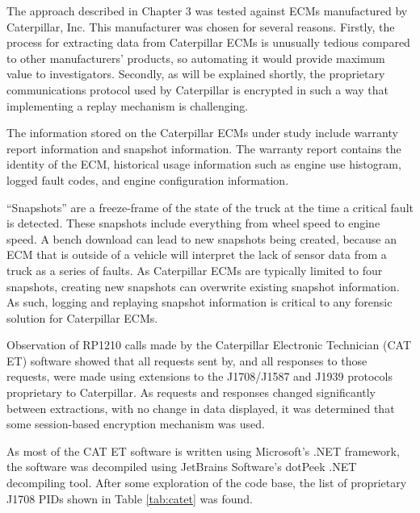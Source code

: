 
The approach described in Chapter 3 was tested against ECMs manufactured by Caterpillar, Inc. This manufacturer was
chosen for several reasons. Firstly, the process for extracting data from Caterpillar ECMs is unusually tedious compared
to other manufacturers' products, so automating it would provide maximum value to investigators.
Secondly, as will be explained shortly, the proprietary communications protocol used
by Caterpillar is encrypted in such a way that implementing a replay mechanism is challenging.


The information stored on the Caterpillar ECMs under study include warranty report information and snapshot
information. The warranty report contains the identity of the ECM, historical usage information such as engine use histogram,
logged fault codes, and engine configuration information.

``Snapshots'' are a freeze-frame of the state of the truck at the time a critical fault is detected. These snapshots
include everything from wheel speed to engine speed. A bench download can lead to new snapshots being created, because an ECM that is outside
of a vehicle will interpret the lack of sensor data from a truck as a series of faults. As Caterpillar ECMs are typically
limited to four snapshots, creating new snapshots can overwrite existing snapshot information. As such, logging and replaying snapshot information is critical to any forensic solution for
Caterpillar ECMs.


Observation of RP1210 calls made by the Caterpillar Electronic Technician (CAT ET) software showed that all requests sent by,
and all responses to those requests, were made using extensions to the J1708/J1587 and J1939 protocols
proprietary to Caterpillar. As requests and responses changed significantly between extractions, with
no change in data displayed, it was determined that some session-based encryption mechanism was
used.


As most of the CAT ET software is written using Microsoft's .NET framework, the software was decompiled
using JetBrains Software's dotPeek .NET decompiling tool. After some exploration of the code base,
the list of proprietary J1708 PIDs shown in Table \ref{tab:catet} was found.


